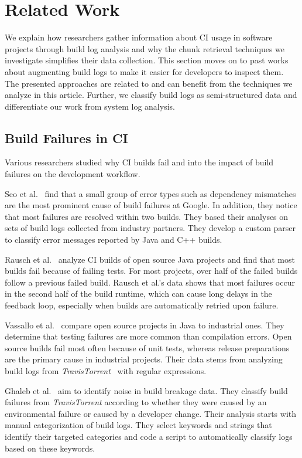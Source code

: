 \section{Related Work}
\label{sec:rw}
We explain how researchers gather information about CI usage in software projects
through build log analysis and why the chunk retrieval techniques we investigate
simplifies their data collection.
This section moves on to past works about augmenting build logs to make it easier
for developers to inspect them.
The presented approaches are related to and can benefit from the techniques we
analyze in this article.
Further, we classify build logs as semi-structured data and differentiate our
work from system log analysis.

\subsection{Build Failures in CI}
Various researchers studied why CI builds fail and into the impact of
build failures on the development workflow.

Seo et al.~\cite{seo2014programmers} find that a small group of error
types such as dependency mismatches are the most prominent cause of
build failures at Google. In addition, they notice that most failures
are resolved within two builds. They based their analyses on sets of
build logs collected from industry partners. They develop a custom
parser to classify error messages reported by Java and C++ builds.

Rausch et al.~\cite{rausch2017empirical} analyze CI builds of open
source Java projects and find that most builds fail because of failing
tests. For most projects, over half of the failed builds follow a
previous failed build. Rausch et al.'s data shows that most failures
occur in the second half of the build runtime, which can cause long
delays in the feedback loop, especially when builds are automatically
retried upon failure.

Vassallo et al.~\cite{vassallo2017a-tale} compare open source projects
in Java to industrial ones. They determine that testing failures are
more common than compilation errors. Open source builds fail most
often because of unit tests, whereas release preparations are the
primary cause in industrial projects. Their data stems from analyzing
build logs from \emph{TravisTorrent}~\cite{beller2017travistorrent}
with regular expressions.

Ghaleb et al.~\cite{ghaleb2019studying} aim to identify noise in build
breakage data. They classify build failures from \emph{TravisTorrent}
according to whether they were caused by an environmental failure or
caused by a developer change. Their analysis starts with manual
categorization of build logs. They select keywords and strings that
identify their targeted categories and code a script to automatically
classify logs based on these keywords.

